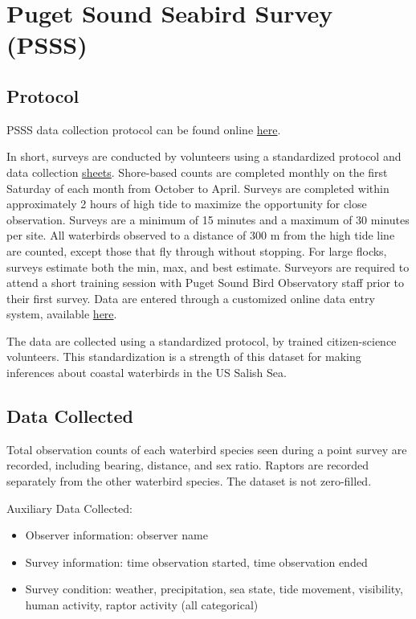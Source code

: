 \documentclass[
  letterpaper,
  DIV=11,
  numbers=noendperiod]{scrreprt}
\begin{document}
\section{Puget Sound Seabird Survey (PSSS)}\label{2.2Data}

\subsection{Protocol}\label{protocol-1}

PSSS data collection protocol can be found online
\href{https://seattleaudubon.org/wp-content/uploads/2021/01/PSSS_Protocol_2014-15.pdf}{here}.

In short, surveys are conducted by volunteers using a standardized
protocol and data collection
\href{https://seattleaudubon.org/wp-content/uploads/2021/09/PSSS-Datasheet.pdf}{sheets}.
Shore-based counts are completed monthly on the first Saturday of each
month from October to April. Surveys are completed within approximately
2 hours of high tide to maximize the opportunity for close observation.
Surveys are a minimum of 15 minutes and a maximum of 30 minutes per
site. All waterbirds observed to a distance of 300 m from the high tide
line are counted, except those that fly through without stopping. For
large flocks, surveys estimate both the min, max, and best estimate.
Surveyors are required to attend a short training session with Puget
Sound Bird Observatory staff prior to their first survey. Data are
entered through a customized online data entry system, available
\href{http://seabirdsurvey.org/seabirdsurvey/}{here}.

The data are collected using a standardized protocol, by trained
citizen-science volunteers. This standardization is a strength of this
dataset for making inferences about coastal waterbirds in the US Salish
Sea.

\subsection{Data Collected}\label{data-collected-1}

Total observation counts of each waterbird species seen during a point
survey are recorded, including bearing, distance, and sex ratio. Raptors
are recorded separately from the other waterbird species. The dataset is
not zero-filled.

Auxiliary Data Collected:

\begin{itemize}
\item
  Observer information: observer name
\item
  Survey information: time observation started, time observation ended
\item
  Survey condition: weather, precipitation, sea state, tide movement,
  visibility, human activity, raptor activity (all categorical)
\end{itemize}
\end{document}
